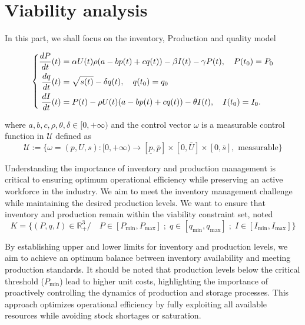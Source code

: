 \documentclass[]{interact}
\theoremstyle{plain}%
\theoremstyle{definition}
\theoremstyle{remark}
\begin{document}




\section{Viability analysis}
In this part, we shall focus on the inventory, Production and quality  model


	\begin{equation}
		\centering
		\left\{\begin{split}
		\frac{dP}{dt}(t)    &  = \alpha U(t) \rho(a-b p(t)+c q(t)) - \beta I(t)- \gamma P(t), \quad P(t_0) = P_{0}\\
			\frac{dq}{dt}(t) 	&  = \sqrt{s(t)} - \delta q(t), \quad q(t_0) = q_{0}\\
			\frac{dI}{dt}(t)         &  = P(t) - \rho U(t) (a-b p(t)+c q(t)) -\theta I(t), \quad  I(t_0) = I_{0}.			
		\end{split}\right.
	\end{equation}
	
where $a, b, c, \rho, \theta, \delta \in [0, +\infty)$ and the control vector $\omega$ is a measurable control function in $\mathcal{U}$ defined as
$$
\mathcal{U}:=\{\omega=(p, U, s ):[0,+\infty) \rightarrow[\underline{p}, \bar{p}]\times [0, \bar{U}]  \times [0, \bar{s}], \text { measurable}\}
$$



Understanding the importance of inventory and production management is critical to ensuring optimum operational efficiency while preserving an active workforce in the industry. We aim to meet the inventory management challenge while maintaining the desired production levels. We want to ensure that inventory and production remain within the viability constraint set, noted $$ K =\{ (P,q,I) \in \mathbb{R}^3_+  /\quad P \in [P_{\text{min}}, P_{\text{max}}]\; ; \; q \in [q_{\text{min}}, q_{\text{max}}]\; ; \; I\in [ I_{\text{min}}, I_{\text{max} }]\}$$
 
By establishing upper and lower limits for inventory and production levels, we aim to achieve an optimum balance between inventory availability and meeting production standards. It should be noted that production levels below the critical threshold ($P_{\text{min}}$) lead to higher unit costs, highlighting the importance of proactively controlling the dynamics of production and storage processes. This approach optimizes operational efficiency by fully exploiting all available resources while avoiding stock shortages or saturation.
\end{document}
